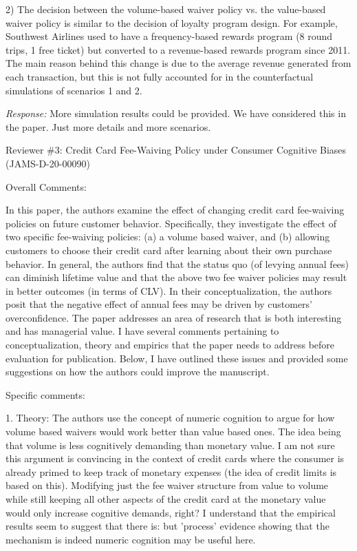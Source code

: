\documentclass[titlepage,12pt,letterpaper]{article}
\numberwithin{equation}{section}
\begin{document}
2) 	The decision between the volume-based waiver policy vs. the value-based waiver policy is similar to the decision of loyalty program design. For example, Southwest Airlines used to have a frequency-based rewards program (8 round trips, 1 free ticket) but converted to a revenue-based rewards program since 2011. The main reason behind this change is due to the average revenue generated from each transaction, but this is not fully accounted for in the counterfactual simulations of scenarios 1 and 2.

\emph{Response:} More simulation results could be provided. We have considered this in the paper. Just more details and more scenarios. 

Reviewer \#3: Credit Card Fee-Waiving Policy under Consumer Cognitive Biases (JAMS-D-20-00090)

Overall Comments:

In this paper, the authors examine the effect of changing credit card fee-waiving policies on future customer behavior. Specifically, they investigate the effect of two specific fee-waiving policies: (a) a volume based waiver, and (b) allowing customers to choose their credit card after learning about their own purchase behavior. In general, the authors find that the status quo (of levying annual fees) can diminish lifetime value and that the above two fee waiver policies may result in better outcomes (in terms of CLV). In their conceptualization, the authors posit that the negative effect of annual fees may be driven by customers' overconfidence. The paper addresses an area of research that is both interesting and has managerial value. I have several comments pertaining to conceptualization, theory and empirics that the paper needs to address before evaluation for publication. Below, I have outlined these issues and provided some suggestions on how the authors could improve
the manuscript.

Specific comments:

1.	Theory: The authors use the concept of numeric cognition to argue for how volume based waivers would work better than value based ones. The idea being that volume is less cognitively demanding than monetary value. I am not sure this argument is convincing in the context of credit cards where the consumer is already primed to keep track of monetary expenses (the idea of credit limits is based on this). Modifying just the fee waiver structure from value to volume while still keeping all other aspects of the credit card at the monetary value would only increase cognitive demands, right? I understand that the empirical results seem to suggest that there is: but 'process' evidence showing that the mechanism is indeed numeric cognition may be useful here.
\end{document}
